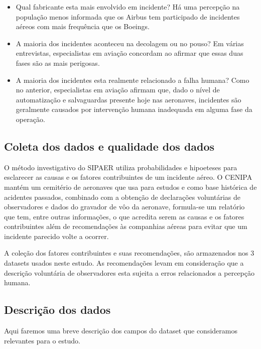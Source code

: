 \documentclass[conference]{IEEEtran}
\begin{document}
\begin{itemize}
 \item Qual fabricante esta mais envolvido em incidente? Há uma percepção na população menos informada que os Airbus tem participado de incidentes aéreos com mais frequência
 que os Boeings.
 \item A maioria dos incidentes aconteceu na decolagem ou no pouso? Em várias entrevistas, especialistas em aviação concordam ao afirmar que essas duas fases são as
 mais perigosas.
 \item A maioria dos incidentes esta realmente relacionado a falha humana? Como no anterior, especialistas em aviação afirmam que, dado o nível de automatização e salvaguardas 
 presente hoje nas aeronaves, incidentes são geralmente causados por intervenção humana inadequada em alguma fase da operação.
\end{itemize}


\subsection{Coleta dos dados e qualidade dos dados}

O método investigativo do SIPAER utiliza probabilidades e hipoeteses para esclarecer as causas e os fatores contribuintes de um incidente aéreo. O CENIPA mantém um 
cemitério de aeronaves que usa para estudos e como base histórica de acidentes passados, combinado com a obtenção de declarações voluntárias de observadores e dados do 
gravador de vôo da aeronave, formula-se um relatório que tem, entre outras informações, o que acredita serem as causas e os fatores contribuintes além de recomendações
às companhias aéreas para evitar que um incidente parecido volte a ocorrer.

A coleção dos fatores contribuintes e suas recomendações, são armazenados nos 3 datasets usados neste estudo. As recomendações levam em consideração que a descrição voluntária
de observadores esta sujeita a erros relacionados a percepção humana.

\subsection{Descrição dos dados}

Aqui faremos uma breve descrição dos campos do dataset que consideramos relevantes para o estudo.
\end{document}

